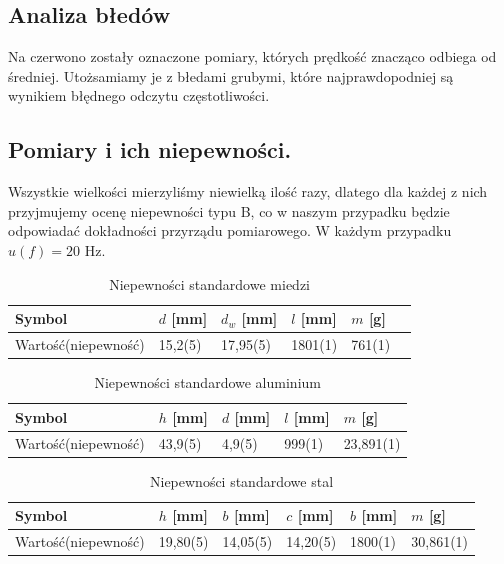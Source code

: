 \documentclass [a4paper,11pt]{article}
\begin{document}
	\subsection{Analiza błedów}
	Na czerwono zostały oznaczone pomiary, których prędkość znacząco odbiega od średniej. Utożsamiamy je z błedami grubymi, które najprawdopodniej są wynikiem błędnego odczytu częstotliwości. 

	\subsection{Pomiary i ich niepewności.}
		
		Wszystkie wielkości mierzyliśmy niewielką ilość razy, dlatego dla każdej z nich przyjmujemy ocenę niepewności typu B, co w naszym przypadku będzie odpowiadać dokładności przyrządu pomiarowego.\newline
		W każdym przypadku $u(f) = 20 \text{ Hz}$.
		\begin{table}[h!]
			\centering
			\caption{Niepewności standardowe miedzi}
			\label{tab:nsmiedz}
			\begin{tabular}{l|l|l|l|l|l}
				 Symbol & \textit{$d$} [mm]  & \textit{$d_w$} [mm]   & \textit{$l$} [mm]     &  \textit{$m$} [g]  \\ \hline
				 Wartość(niepewność) & 15,2(5)      & 17,95(5) & 1801(1) & 761(1) \\
			\end{tabular}
		\end{table}
	
		\begin{table}[h!]
			\centering
			\caption{Niepewności standardowe aluminium}
			\label{tab:nsaluminium}
			\begin{tabular}{l|l|l|l|l}
				Symbol & \textit{$h$} [mm]  & \textit{$d$} [mm]   & \textit{$l$} [mm]     &  \textit{$m$} [g]   \\ \hline
				Wartość(niepewność) & 43,9(5)      & 4,9(5) & 999(1) & 23,891(1) \\
			\end{tabular}
		\end{table}
		
		\begin{table}[h!]
			\centering
			\caption{Niepewności standardowe stal}
			\label{tab:nsstal}
			\begin{tabular}{l|l|l|l|l|l}
				Symbol & \textit{$h$} [mm]  & \textit{$b$} [mm]   & \textit{$c$} [mm]  & \textit{$b$} [mm]      & \textit{$m$} [g]   \\ \hline
				Wartość(niepewność) &19,80(5) & 14,05(5)      & 14,20(5) & 1800(1) & 30,861(1) \\
			\end{tabular}
		\end{table}
	
\end{document}
